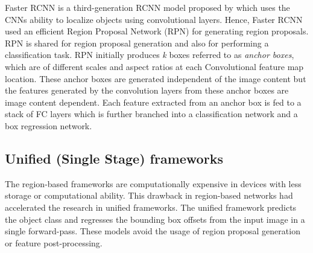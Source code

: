     
    Faster RCNN is a third-generation RCNN model proposed by \citet{Ren2017} which uses the CNNs ability to localize objects using convolutional layers. Hence, Faster RCNN used an efficient Region Proposal Network (RPN) for generating region proposals. RPN is shared for region proposal generation and also for performing a classification task. RPN initially produces \textit{k} boxes referred to as \textit{anchor boxes}, which are of different scales and aspect ratios at each Convolutional feature map location. These anchor boxes are generated independent of the image content but the features generated by the convolution layers from these anchor boxes are image content dependent. Each feature extracted from an anchor box is fed to a stack of FC layers which is further branched into a classification network and a box regression network.
    
    
    \subsection{Unified (Single Stage) frameworks}
    The region-based frameworks are computationally expensive in devices with less storage or computational ability. This drawback in region-based networks had accelerated the research in unified frameworks. The unified framework predicts the object class and regresses the bounding box offsets from the input image in a single forward-pass. These models avoid the usage of region proposal generation or feature post-processing.
    

